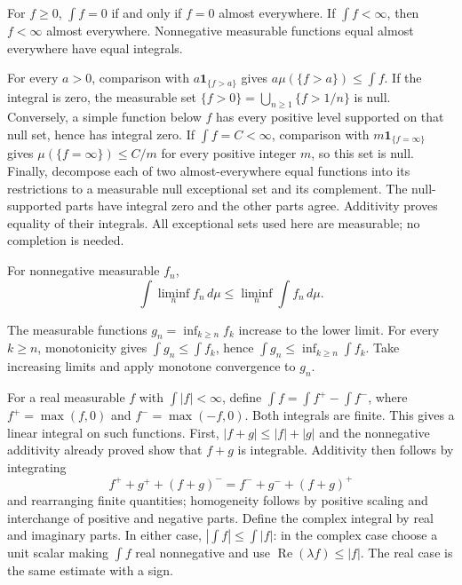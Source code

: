 \begin{lemma}
For $f\geq0$, $\int f=0$ if and only if $f=0$ almost everywhere.
If $\int f<\infty$, then $f<\infty$ almost everywhere. Nonnegative
measurable functions equal almost everywhere have equal integrals.
\end{lemma}
\Proof
For every $a>0$, comparison with $a\mathbf1_{\{f>a\}}$ gives
$a\mu(\{f>a\})\leq\int f$. If the integral is zero, the measurable
set $\{f>0\}=\bigcup_{n\geq1}\{f>1/n\}$ is null. Conversely, a
simple function below $f$ has every positive level supported on that
null set, hence has integral zero. If $\int f=C<\infty$, comparison
with $m\mathbf1_{\{f=\infty\}}$ gives
$\mu(\{f=\infty\})\leq C/m$ for every positive integer $m$, so this
set is null. Finally, decompose each of two almost-everywhere equal
functions into its restrictions to a measurable null exceptional set
and its complement. The null-supported parts have integral zero and
the other parts agree. Additivity proves equality of their integrals.
All exceptional sets used here are measurable; no completion is needed.
\Done

\begin{theorem}
\label{thm:fatou}
For nonnegative measurable $f_n$,
\[
\int\liminf_n f_n\,d\mu\leq\liminf_n\int f_n\,d\mu.
\]
\end{theorem}
\Proof
The measurable functions $g_n=\inf_{k\geq n}f_k$ increase to the lower
limit. For every $k\geq n$, monotonicity gives $\int g_n\leq\int f_k$,
hence $\int g_n\leq\inf_{k\geq n}\int f_k$. Take increasing limits
and apply monotone convergence to $g_n$.
\Done

For a real measurable $f$ with $\int|f|<\infty$, define
$\int f=\int f^+-\int f^-$, where $f^+=\max(f,0)$ and
$f^-=\max(-f,0)$. Both integrals are finite. This gives a linear
integral on such functions. First, $|f+g|\leq|f|+|g|$ and the
nonnegative additivity already proved show that $f+g$ is integrable.
Additivity then follows by integrating
\[
f^++g^++(f+g)^-=f^-+g^-+(f+g)^+
\]
and rearranging finite quantities; homogeneity follows by positive scaling
and interchange of positive and negative parts. Define the complex
integral by real and imaginary parts. In either case,
$|\int f|\leq\int|f|$: in the complex case choose a unit scalar making
$\int f$ real nonnegative and use $\operatorname{Re}(\lambda f)\leq|f|$.
The real case is the same estimate with a sign.

